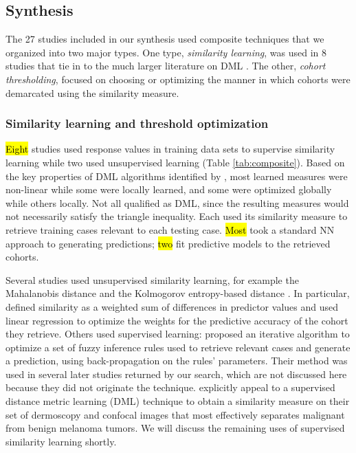 \documentclass[sn-mathphys,Numbered,pdflatex]{sn-jnl}
\theoremstyle{remark}
\theoremstyle{definition}
\begin{document}
\subsection{Synthesis}\label{synthesis-1}

The 27 studies included in our synthesis used composite techniques that
we organized into two major types. One type, \emph{similarity learning},
was used in 8 studies that tie in to the much larger literature on DML
\citep{Yang2006}. The other, \emph{cohort thresholding}, focused on
choosing or optimizing the manner in which cohorts were demarcated using
the similarity measure.

\subsubsection{Similarity learning and threshold
optimization}\label{similarity-learning-and-threshold-optimization}

\hl{Eight} studies used response values in training data sets to
supervise similarity learning while two used unsupervised learning
(Table \ref{tab:composite}). Based on the key properties of DML
algorithms identified by \citet{Bellet2014}, most learned measures were
non-linear while some were locally learned, and some were optimized
globally while others locally. Not all qualified as DML, since the
resulting measures would not necessarily satisfy the triangle
inequality. Each used its similarity measure to retrieve training cases
relevant to each testing case. \hl{Most} took a standard NN approach to
generating predictions; \hl{two} \citep{Vilhena2016, Tang2021} fit
predictive models to the retrieved cohorts.

Several studies used unsupervised similarity learning, for example the
Mahalanobis distance \citep{Lowsky2013} and the Kolmogorov entropy-based
distance \citep{Elter2007}. In particular, \citet{Yearwood1997} defined
similarity as a weighted sum of differences in predictor values and used
linear regression to optimize the weights for the predictive accuracy of
the cohort they retrieve. Others used supervised learning:
\citet{Song2006} proposed an iterative algorithm to optimize a set of
fuzzy inference rules used to retrieve relevant cases and generate a
prediction, using back-propagation on the rules' parameters. Their
method was used in several later studies returned by our search, which
are not discussed here because they did not originate the technique.
\citet{Nicolas2014} explicitly appeal to a supervised distance metric
learning (DML) technique \citep{Xing2002} to obtain a similarity measure
on their set of dermoscopy and confocal images that most effectively
separates malignant from benign melanoma tumors. We will discuss the
remaining uses of supervised similarity learning shortly.
\end{document}
